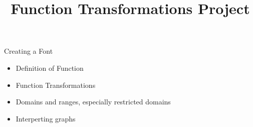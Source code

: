 \documentclass{ximera}
\author{}
\title{Function Transformations Project}
\begin{document}
\begin{abstract}
\end{abstract}
\maketitle


\begin{objectives}

\item Creating a Font
\begin{itemize}
	\item Definition of Function
	\item Function Transformations
	\item Domains and ranges, especially restricted domains
	\item Interperting graphs
\end{itemize}



\end{objectives}
\end{document}
